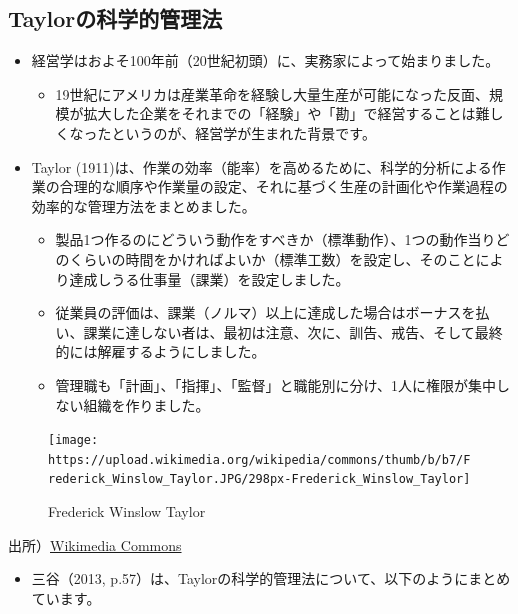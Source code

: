 \documentclass[
]{book}
\providecommand{\tightlist}{%
  \setlength{\itemsep}{0pt}\setlength{\parskip}{0pt}}
\begin{document}
\hypertarget{taylor}{%
\subsection{Taylorの科学的管理法}\label{taylor}}

\begin{itemize}
\item
  経営学はおよそ100年前（20世紀初頭）に、実務家によって始まりました。

  \begin{itemize}
  \tightlist
  \item
    19世紀にアメリカは産業革命を経験し大量生産が可能になった反面、規模が拡大した企業をそれまでの「経験」や「勘」で経営することは難しくなったというのが、経営学が生まれた背景です。
  \end{itemize}
\item
  Taylor (1911)は、作業の効率（能率）を高めるために、科学的分析による作業の合理的な順序や作業量の設定、それに基づく生産の計画化や作業過程の効率的な管理方法をまとめました。

  \begin{itemize}
  \item
    製品1つ作るのにどういう動作をすべきか（標準動作）、1つの動作当りどのくらいの時間をかければよいか（標準工数）を設定し、そのことにより達成しうる仕事量（課業）を設定しました。
  \item
    従業員の評価は、課業（ノルマ）以上に達成した場合はボーナスを払い、課業に達しない者は、最初は注意、次に、訓告、戒告、そして最終的には解雇するようにしました。
  \item
    管理職も「計画」、「指揮」、「監督」と職能別に分け、1人に権限が集中しない組織を作りました。
  \end{itemize}
\end{itemize}

\begin{figure}
\texttt{[image: https://upload.wikimedia.org/wikipedia/commons/thumb/b/b7/Frederick\_Winslow\_Taylor.JPG/298px-Frederick\_Winslow\_Taylor]} \caption{Frederick Winslow Taylor}\label{fig:ftaylor}
\end{figure}

出所）\href{https://commons.wikimedia.org/wiki/File:Frederick_Winslow_Taylor.JPG}{Wikimedia Commons}

\begin{itemize}
\tightlist
\item
  三谷（2013, p.57）は、Taylorの科学的管理法について、以下のようにまとめています。
\end{itemize}
\end{document}
